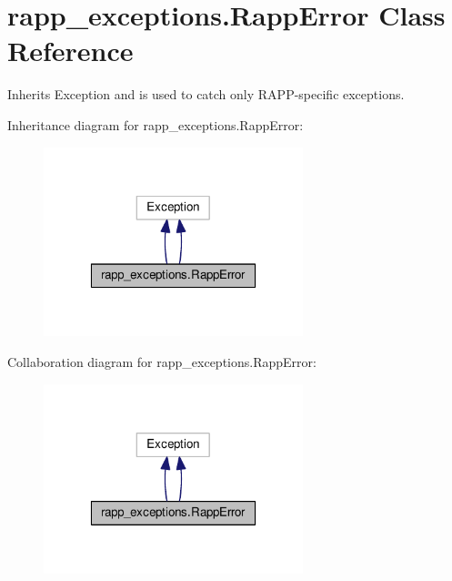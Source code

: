 \hypertarget{classrapp__exceptions_1_1RappError}{\section{rapp\-\_\-exceptions.\-Rapp\-Error Class Reference}
\label{classrapp__exceptions_1_1RappError}
}


Inherits Exception and is used to catch only R\-A\-P\-P-\/specific exceptions.  




Inheritance diagram for rapp\-\_\-exceptions.\-Rapp\-Error\-:
\nopagebreak
\begin{figure}[H]
\begin{center}
\leavevmode
\includegraphics[width=214pt]{classrapp__exceptions_1_1RappError__inherit__graph}
\end{center}
\end{figure}


Collaboration diagram for rapp\-\_\-exceptions.\-Rapp\-Error\-:
\nopagebreak
\begin{figure}[H]
\begin{center}
\leavevmode
\includegraphics[width=214pt]{classrapp__exceptions_1_1RappError__coll__graph}
\end{center}
\end{figure}
